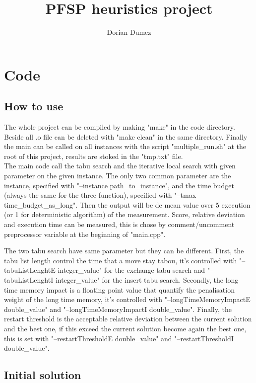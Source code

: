 \documentclass[12pt,a4paper]{article}
\title{PFSP heuristics project}
\author{Dorian Dumez}
\begin{document}
\maketitle

\section{Code}

\subsection{How to use}

The whole project can be compiled by making "make" in the code directory. Beside all .o file can be deleted with "make clean" in the same directory. Finally the main can be called on all instances with the script "multiple\_run.sh" at the root of this project, results are stoked in the "tmp.txt" file.\\

The main code call the tabu search and the iterative local search with given parameter on the given instance. The only two common parameter are the instance, specified with "--instance path\_to\_instance", and the time budget (always the same for the three function), specified with "--tmax time\_budget\_as\_long". Then the output will be de mean value over 5 execution (or 1 for deterministic algorithm) of the measurement. Score, relative deviation and execution time can be measured, this is chose by comment/uncomment preprocessor variable at the beginning of "main.cpp".

The two tabu search have same parameter but they can be different. First, the tabu list length control the time that a move stay tabou, it's controlled with "--tabuListLenghtE integer\_value" for the exchange tabu search and "--tabuListLenghtI integer\_value" for the insert tabu search. Secondly, the long time memory impact is a floating point value that quantify the penalisation weight of the long time memory, it's controlled with "--longTimeMemoryImpactE double\_value" and "--longTimeMemoryImpactI double\_value". Finally, the restart threshold is the acceptable relative deviation between the current solution and the best one, if this exceed the current solution become again the best one, this is set with "--restartThresholdE double\_value" and "--restartThresholdI double\_value".

\subsection{Initial solution}
\end{document}
